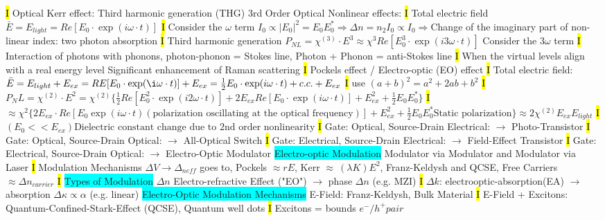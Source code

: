 \documentclass[fontsize=3]{scrartcl}
\begin{document}
\hl{I}
Optical Kerr effect: Third harmonic generation (THG) 3rd Order Optical Nonlinear effects:
\hl{I}
Total electric field $ \bar{E} = E_{light} = Re [ E_0 \cdot \exp(i \omega \cdot t) ] $
\hl{I}
Consider the $\omega$ term $I_0 \propto |E_0|^2 = E_0 E_0^* \Rightarrow \Delta n = n_2 I_0 \propto I_0 \Rightarrow $Change of the imaginary part of non-linear index: two photon absorption
\hl{I}
Third harmonic generation $P_{NL} = \chi^{(3)} \cdot E^3 \approx \chi^{3} Re[E_0^3 \cdot \exp(i3\omega \cdot t)]$ Consider the $3\omega$ term
\hl{I}
Interaction of photons with phonons, photon-phonon = Stokes line, Photon + Phonon = anti-Stokes line
\hl{I}
When the virtual levels align with a real energy level Significant enhancement of Raman scattering
\hl{I}
Pockels effect / Electro-optic (EO) effect
\hl{I}
Total electric field: $ \bar{E} = E_{light} + E_{ex} = RE[E_0 \cdot \exp(\i \omega \cdot t)] + E_{ex} = \frac{1}{2}E_0 \cdot \exp (i \omega \cdot t) + c.c. + E_{ex} $
\hl{I}
use $(a+b)^2 = a^2 + 2ab+b^2$
\hl{I}
$P_NL = \chi^{(2)} \cdot E^{2} = \chi^{(2)} \{ \frac{1}{2}Re[E_0^2 \cdot \exp(i2\omega \cdot t)] + 2E_{ex} Re[E_0 \cdot \exp(i\omega \cdot t)] + E_{ex}^{2} + \frac{1}{2}E_0 E_0^* \}   $ 
\hl{I}
$\approx \chi^2 \{2 E_{ex} \cdot Re[E_0 \exp(i\omega \cdot t) (\text{polarization oscillating at the optical frequency})] + E_{ex}^2 + \frac{1}{2}E_0 E_0^* \text{Static polarization} \}  \approx 2\chi^{(2)} E_{ex} E_{light} $
\hl{I}
$(E_0 << E_{ex}) \text{Dielectric constant change due to 2nd order nonlinearity} $
\hl{I}
Gate: Optical, Source-Drain Electrical: $\rightarrow$ Photo-Transistor
\hl{I}
Gate: Optical, Source-Drain Optical: $\rightarrow$  All-Optical Switch
\hl{I}
Gate: Electrical, Source-Drain Electrical: $\rightarrow$  Field-Effect Transistor
\hl{I}
Gate: Electrical, Source-Drain Optical: $\rightarrow$  Electro-Optic Modulator
\colorbox{Cyan}{Electro-optic Modulation}
Modulator via Modulator and Modulator via Laser
\hl{I}
Modulation Mechanisms $\Delta V \rightarrow \Delta_{neff}$ goes to, Pockels $\approx rE$, Kerr $\approx ~(\lambda K) E^2$, Franz-Keldysh and QCSE, Free Carriers $\approx \Delta n_{carrier} $
\hl{I}
\colorbox{Cyan}{Types of Modulation}
$\Delta n$ Electro-refractive Effect ("EO") $\rightarrow$ phase $\Delta n$ (e.g. MZI)
\hl{I}
$\Delta k$: electrooptic-absorption(EA) $\rightarrow$ absorption $\Delta \kappa \propto \alpha$ (e.g. linear)
\colorbox{Cyan}{Electro-Optic Modulation Mechanisms}
E-Field: Franz-Keldysh, Bulk Material
\hl{I}
E-Field + Excitons: Quantum-Confined-Stark-Effect (QCSE), Quantum well dots
\hl{I}
Excitons = bounds $e^{-}/h^{+} pair$
\end{document}

